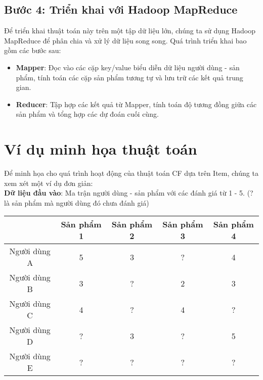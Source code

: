 \subsection*{Bước 4: Triển khai với Hadoop MapReduce}
Để triển khai thuật toán này trên một tập dữ liệu lớn, chúng ta sử dụng
Hadoop MapReduce để phân chia và xử lý dữ liệu song song. Quá trình triển khai
bao gồm các bước sau:
\pagebreak
\begin{itemize}
    \item \textbf{Mapper}: Đọc vào các cặp key/value biểu diễn dữ liệu
          người dùng - sản phẩm, tính toán các cặp sản phẩm tương tự và
          lưu trữ các kết quả trung gian.
    \item \textbf{Reducer}: Tập hợp các kết quả từ Mapper, tính toán
          độ tương đồng giữa các sản phẩm và tổng hợp các dự đoán cuối cùng.
\end{itemize}

\raggedright
\section{Ví dụ minh họa thuật toán}
Để minh họa cho quá trình hoạt động của thuật toán CF dựa trên Item,
chúng ta xem xét một ví dụ đơn giản:\\
\vspace{0.5cm}
\textbf{Dữ liệu đầu vào}: Ma trận người dùng -
sản phẩm với các đánh giá từ 1 - 5. (? là sản phẩm mà người dùng đó chưa đánh giá)\\
\renewcommand{\arraystretch}{2}
{\centering
    \begin{tabular}{ |c|c|c|c|c| }
        \hline
                     & Sản phẩm 1 & Sản phẩm 2 & Sản phẩm 3 & Sản phẩm 4 \\
        \hline
        Người dùng A & 5          & 3          & ?          & 4          \\
        \hline
        Người dùng B & 3          & ?          & 2          & 3          \\
        \hline
        Người dùng C & 4          & ?          & 4          & ?          \\
        \hline
        Người dùng D & ?          & 3          & ?          & 5          \\
        \hline
        Người dùng E & ?          & ?          & ?          & ?          \\
        \hline
    \end{tabular}
    \par}

